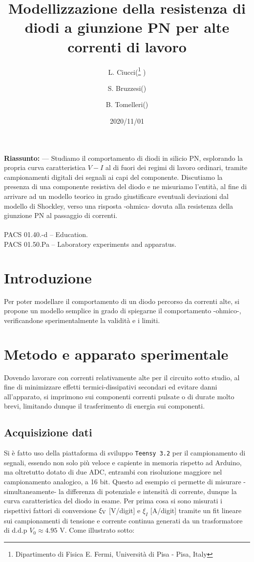 \documentclass{article}[a4paper, oneside, 11pt]
\title{Modellizzazione della resistenza di diodi a giunzione PN per alte correnti di lavoro}
\author{L. Ciucci(\thanks{Dipartimento di Fisica E. Fermi, Universit\`a di Pisa - Pisa, Italy} ) \and S. Bruzzesi(\protect\footnotemark[1] ) \and B. Tomelleri(\protect\footnotemark[1] )}
\date{2020/11/01}
\begin{document}
\maketitle

\begin{mdframed}
\textbf{Riassunto:} --- Studiamo il comportamento di diodi in silicio PN, esplorando la propria curva caratteristica $V - I$ al di fuori dei regimi di lavoro ordinari, tramite campionamenti digitali dei segnali ai capi del componente. Discutiamo la presenza di una componente resistiva del diodo e ne misuriamo l'entità, al fine di arrivare ad un modello teorico in grado giustificare eventuali deviazioni dal modello di Shockley, verso una risposta -ohmica- dovuta alla resistenza della giunzione PN al passaggio di correnti.\\\\
PACS 01.40.-d – Education.\\
PACS 01.50.Pa – Laboratory experiments and apparatus.
\end{mdframed}

\section{Introduzione}
Per poter modellare il comportamento di un diodo percorso da correnti alte, si propone un modello semplice in grado di spiegarne il comportamento -ohmico-, verificandone sperimentalmente la validità e i limiti.
\section{Metodo e apparato sperimentale}
Dovendo lavorare con correnti relativamente alte per il circuito sotto studio, al fine di minimizzare effetti termici-dissipativi secondari ed evitare danni all'apparato, si imprimono sui componenti correnti pulsate o di durate molto brevi, limitando dunque il trasferimento di energia sui componenti.
\subsection{Acquisizione dati}
Si è fatto uso della piattaforma di sviluppo \verb+Teensy 3.2+\cite{teensy} per il campionamento di segnali, essendo non solo più veloce e capiente in memoria rispetto ad Arduino, ma oltretutto dotato di due ADC, entrambi con risoluzione maggiore nel campionamento analogico, a 16 bit. Questo ad esempio ci permette di misurare -simultaneamente- la differenza di potenziale e intensità di corrente, dunque la curva caratteristica del diodo in esame. Per prima cosa si sono misurati i rispettivi fattori di conversione $\xi_{\rm V}$ [V/digit] e $\xi_I$ [A/digit] tramite un fit lineare sui campionamenti di tensione e corrente continua generati da un trasformatore di d.d.p $V_0 \approx 4.95$ V. Come illustrato sotto:

\end{document}
